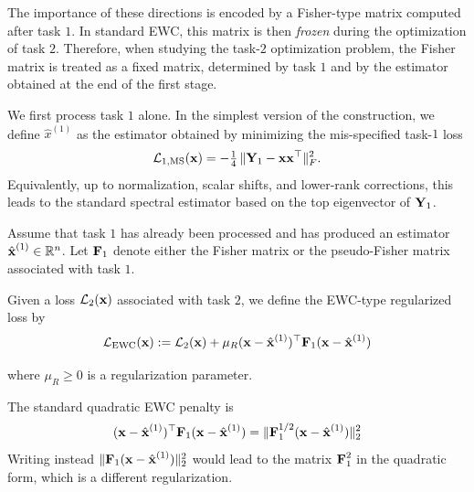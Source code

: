 \documentclass[11pt]{article}
\begin{document}
The importance of these directions is encoded by a Fisher-type matrix computed after task $1$. In standard EWC, this matrix is then \emph{frozen} during the optimization of task $2$. Therefore, when studying the task-$2$ optimization problem, the Fisher matrix is treated as a fixed matrix, determined by task $1$ and by the estimator obtained at the end of the first stage.


\begin{defn}
We first process task $1$ alone. In the simplest version of the construction, we define $\hat x^{(1)}$ as the estimator obtained by minimizing the mis-specified task-$1$ loss
\[
\mathcal{L}_{\mathrm{1,MS}}(\boldsymbol{\mathbf{x}}) = -\tfrac{1}{4}\,\|\boldsymbol{\mathbf{Y}}_1 - \boldsymbol{\mathbf{x}} \boldsymbol{\mathbf{x}}^\top\|_F^2 .
\]
Equivalently, up to normalization, scalar shifts, and lower-rank corrections, this leads to the standard spectral estimator based on the top eigenvector of $\boldsymbol{\mathbf{Y}}_1$.
\end{defn}

\begin{defn}
Assume that task $1$ has already been processed and has produced an estimator $\hat{\boldsymbol{\mathbf{x}}}^{(1)}\in\mathbb R^n$. Let $\boldsymbol{\mathbf{F}}_1$ denote either the Fisher matrix or the pseudo-Fisher matrix associated with task $1$.

Given a loss $\mathcal L_2(\boldsymbol{\mathbf{x}})$ associated with task $2$, we define the EWC-type regularized loss by
\begin{equation}
    \mathcal L_{\mathrm{EWC}}(\boldsymbol{\mathbf{x}})
    :=
    \mathcal L_2(\boldsymbol{\mathbf{x}})
    +
    \mu_R (\boldsymbol{\mathbf{x}}-\hat{\boldsymbol{\mathbf{x}}}^{(1)})^\top \boldsymbol{\mathbf{F}}_1 (\boldsymbol{\mathbf{x}}-\hat{\boldsymbol{\mathbf{x}}}^{(1)})
    \label{eq:LossEWC}
\end{equation}

where $\mu_R\geq 0$ is a regularization parameter.
\end{defn}

\begin{rem}
The standard quadratic EWC penalty is
\[
(\boldsymbol{\mathbf{x}}-\hat{\boldsymbol{\mathbf{x}}}^{(1)})^\top \boldsymbol{\mathbf{F}}_1 (\boldsymbol{\mathbf{x}}-\hat{\boldsymbol{\mathbf{x}}}^{(1)})
=
\|\boldsymbol{\mathbf{F}}_1^{1/2}(\boldsymbol{\mathbf{x}}-\hat{\boldsymbol{\mathbf{x}}}^{(1)})\|_2^2
\]
Writing instead $\|\boldsymbol{\mathbf{F}}_1(\boldsymbol{\mathbf{x}}-\hat{\boldsymbol{\mathbf{x}}}^{(1)})\|_2^2$ would lead to the matrix $\boldsymbol{\mathbf{F}}_1^2$ in the quadratic form, which is a different regularization.
\end{rem}
\end{document}
